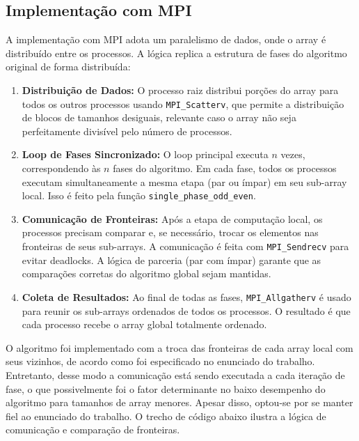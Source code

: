 \documentclass[12pt, a4paper]{article}
\begin{document}
\subsection{Implementação com MPI}
A implementação com MPI adota um paralelismo de dados, onde o array é distribuído entre os processos. A lógica replica a estrutura de fases do algoritmo original de forma distribuída:
\begin{enumerate}
    \item \textbf{Distribuição de Dados:} O processo raiz distribui porções do array para todos os outros processos usando \texttt{MPI\_Scatterv}, que permite a distribuição de blocos de tamanhos desiguais, relevante caso o array não seja perfeitamente divisível pelo número de processos.
    \item \textbf{Loop de Fases Sincronizado:} O loop principal executa $n$ vezes, correspondendo às $n$ fases do algoritmo. Em cada fase, todos os processos executam simultaneamente a mesma etapa (par ou ímpar) em seu sub-array local. Isso é feito pela função \texttt{single\_phase\_odd\_even}.
    \item \textbf{Comunicação de Fronteiras:} Após a etapa de computação local, os processos precisam comparar e, se necessário, trocar os elementos nas fronteiras de seus sub-arrays. A comunicação é feita com \texttt{MPI\_Sendrecv} para evitar deadlocks. A lógica de parceria (par com ímpar) garante que as comparações corretas do algoritmo global sejam mantidas.
    \item \textbf{Coleta de Resultados:} Ao final de todas as fases, \texttt{MPI\_Allgatherv} é usado para reunir os sub-arrays ordenados de todos os processos. O resultado é que cada processo recebe o array global totalmente ordenado.
\end{enumerate}

O algoritmo foi implementado com a troca das fronteiras de cada array local com seus vizinhos, de acordo como foi especificado no enunciado do trabalho. Entretanto, desse modo a comunicação está sendo executada a cada iteração de fase, o que possivelmente foi o fator determinante no baixo desempenho do algoritmo para tamanhos de array menores. Apesar disso, optou-se por se manter fiel ao enunciado do trabalho. O trecho de código abaixo ilustra a lógica de comunicação e comparação de fronteiras.
\end{document}
